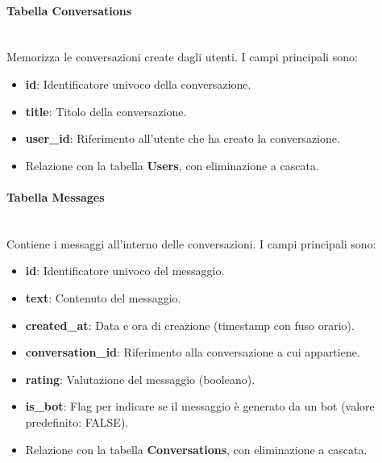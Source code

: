     \paragraph{Tabella Conversations} \mbox{} \\
    Memorizza le conversazioni create dagli utenti. I campi principali sono:
    \begin{itemize}
        \item \textbf{id}: Identificatore univoco della conversazione.
        \item \textbf{title}: Titolo della conversazione.
        \item \textbf{user\_id}: Riferimento all’utente che ha creato la conversazione.
        \item Relazione con la tabella \textbf{Users}, con eliminazione a cascata.
    \end{itemize}
    
    \paragraph{Tabella Messages} \mbox{} \\
    Contiene i messaggi all’interno delle conversazioni. I campi principali sono:
    \begin{itemize}
        \item \textbf{id}: Identificatore univoco del messaggio.
        \item \textbf{text}: Contenuto del messaggio.
        \item \textbf{created\_at}: Data e ora di creazione (timestamp con fuso orario).
        \item \textbf{conversation\_id}: Riferimento alla conversazione a cui appartiene.
        \item \textbf{rating}: Valutazione del messaggio (booleano).
        \item \textbf{is\_bot}: Flag per indicare se il messaggio è generato da un bot (valore predefinito: FALSE).
        \item Relazione con la tabella \textbf{Conversations}, con eliminazione a cascata.
    \end{itemize}
    
